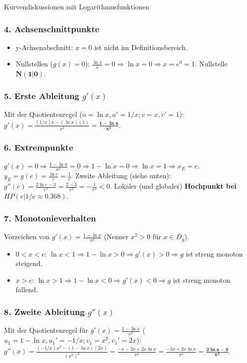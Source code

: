 \begin{loesungsumgebung}{Kurvendiskussionen mit Logarithmusfunktionen}
\begin{enumerate}[label=(\alph*)]
    \subsubsection*{4. Achsenschnittpunkte}
    \begin{itemize}
        \item y-Achsenabschnitt: $x=0$ ist nicht im Definitionsbereich.
        \item Nullstellen ($g(x)=0$): $\frac{\ln x}{x}=0 \Rightarrow \ln x = 0 \Rightarrow x = e^0 = 1$.
        Nullstelle $\mathbf{N(1|0)}$.
    \end{itemize}

    \subsubsection*{5. Erste Ableitung $g'(x)$}
    Mit der Quotientenregel ($u=\ln x, u'=1/x; v=x, v'=1$):
    $g'(x) = \frac{(1/x)x - (\ln x)(1)}{x^2} = \mathbf{\frac{1-\ln x}{x^2}}$.

    \subsubsection*{6. Extrempunkte}
    $g'(x)=0 \Rightarrow \frac{1-\ln x}{x^2}=0 \Rightarrow 1-\ln x = 0 \Rightarrow \ln x = 1 \Rightarrow x_E=e$.
    $y_E = g(e) = \frac{\ln e}{e} = \frac{1}{e}$.
    Zweite Ableitung (siehe unten): $g''(e) = \frac{2\ln e - 3}{e^3} = \frac{2-3}{e^3} = -\frac{1}{e^3} < 0$.
    Lokaler (und globaler) \textbf{Hochpunkt bei $HP(e|1/e \approx 0.368)$}.

    \subsubsection*{7. Monotonieverhalten}
    Vorzeichen von $g'(x)=\frac{1-\ln x}{x^2}$ (Nenner $x^2>0$ für $x \in D_g$).
    \begin{itemize}
        \item $0 < x < e$: $\ln x < 1 \Rightarrow 1-\ln x > 0 \Rightarrow g'(x) > 0 \Rightarrow g$ ist streng monoton steigend.
        \item $x > e$: $\ln x > 1 \Rightarrow 1-\ln x < 0 \Rightarrow g'(x) < 0 \Rightarrow g$ ist streng monoton fallend.
    \end{itemize}

    \subsubsection*{8. Zweite Ableitung $g''(x)$}
    Mit der Quotientenregel für $g'(x)=\frac{1-\ln x}{x^2}$ ($u_1=1-\ln x, u_1'=-1/x; v_1=x^2, v_1'=2x$):
    $g''(x) = \frac{(-1/x)x^2 - (1-\ln x)(2x)}{(x^2)^2} = \frac{-x - 2x + 2x\ln x}{x^4} = \frac{-3x + 2x\ln x}{x^4} = \mathbf{\frac{2\ln x - 3}{x^3}}$.


\end{enumerate}
\end{loesungsumgebung}
